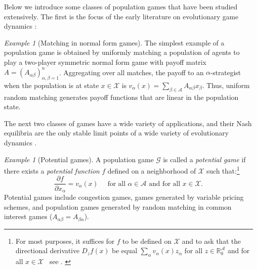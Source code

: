 \documentclass[reqno]{amsart}
\theoremstyle{plain}
\theoremstyle{definition}
\theoremstyle{remark}
\newtheorem{example}[theorem]{Example}
\numberwithin{equation}{section}
\numberwithin{theorem}{section}
\begin{document}
Below we introduce some classes of population games that have been studied extensively.
The first is the focus of the early literature on evolutionary game dynamics \citep{HS98,Wei95}:

\begin{example}
[Matching in normal form games]
\label{ex:matching}
The simplest example of a population game is obtained by uniformly matching a population of agents to play a two-player symmetric normal form game with payoff matrix $A = (A_{\alpha\beta})_{\alpha,\beta=1}^{n}$.
Aggregating over all matches, the payoff to an $\alpha$-strategist when the population is at state $x\in{\mathcal{X}}$ is ${v}_{\alpha}(x) = {\sum\nolimits}_{\beta\in{\mathcal{A}}} A_{\alpha\beta} x_{\beta}$.
Thus, uniform random matching generates payoff functions that are linear in the population state.
\end{example}

The next two classes of games have a wide variety of applications, and their Nash equilibria are the only stable limit points of a wide variety of evolutionary dynamics \citep{San10}.

\begin{example}
[Potential games]
\label{ex:potential}
A population game ${\mathcal{G}}$ is called a \emph{potential game} \citep{San01,San09} if there exists a \emph{potential function} ${f}$ defined on a neighborhood of ${\mathcal{X}}$ such that:\footnote{For most purposes, it suffices for ${f}$ to be defined on ${\mathcal{X}}$ and to ask that the directional derivative $D_{z} {f}(x)$ be equal ${\sum\nolimits}_{\alpha} {v}_{\alpha}(x) z_{\alpha}$ for all $z \in {\mathbb{R}}_{0}^{\mathcal{A}}$ and for all $x \in {\mathcal{X}}$ \textendash\ see \cite{San09}.
\label{fn:PG}}
\begin{equation}
\label{eq:potential}
\frac{{\partial}{f}}{{\partial} x_{\alpha}}
	={v}_{\alpha}(x)
	\quad
	\text{ for all $\alpha\in{\mathcal{A}}$ and for all $x\in{\mathcal{X}}$.}
\end{equation}
Potential games include congestion games,
games generated by variable pricing schemes,
and population games generated by random matching in common interest games ($A_{\alpha\beta} = A_{\beta\alpha}$).
\end{example}
\end{document}
